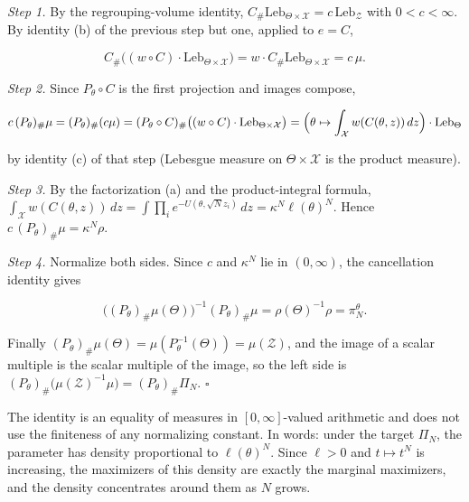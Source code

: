 \documentclass[11pt,a4paper]{article}
\begin{document}
\emph{Step 1.} By the regrouping-volume identity, \(C_\#\mathrm{Leb}_{\Theta\times\mathcal X}=c\,\mathrm{Leb}_{\mathcal Z}\) with \(0<c<\infty\). By identity (b) of the previous step but one, applied to \(e=C\),


\[C_\#\bigl((w\circ C)\cdot\mathrm{Leb}_{\Theta\times\mathcal X}\bigr)=w\cdot C_\#\mathrm{Leb}_{\Theta\times\mathcal X}=c\,\mu .\]


\emph{Step 2.} Since \(P_\theta\circ C\) is the first projection and images compose,


\[c\,(P_\theta)_\#\mu=(P_\theta)_\#(c\mu)=(P_\theta\circ C)_\#\bigl((w\circ C)\cdot\mathrm{Leb}_{\Theta\times\mathcal X}\bigr)=\Bigl(\theta\mapsto\int_{\mathcal X}w(C(\theta,z))\,dz\Bigr)\cdot\mathrm{Leb}_\Theta\]


by identity (c) of that step (Lebesgue measure on \(\Theta\times\mathcal X\) is the product measure).




\emph{Step 3.} By the factorization (a) and the product-integral formula, \(\int_{\mathcal X}w(C(\theta,z))\,dz=\int\prod_ie^{-U(\theta,\sqrt Nz_i)}\,dz=\kappa^N\ell(\theta)^N\). Hence \(c\,(P_\theta)_\#\mu=\kappa^N\rho\).




\emph{Step 4.} Normalize both sides. Since \(c\) and \(\kappa^N\) lie in \((0,\infty)\), the cancellation identity gives


\[\bigl((P_\theta)_\#\mu(\Theta)\bigr)^{-1}(P_\theta)_\#\mu=\rho(\Theta)^{-1}\rho=\pi_N^\theta .\]


Finally \((P_\theta)_\#\mu(\Theta)=\mu(P_\theta^{-1}(\Theta))=\mu(\mathcal Z)\), and the image of a scalar multiple is the scalar multiple of the image, so the left side is \((P_\theta)_\#\bigl(\mu(\mathcal Z)^{-1}\mu\bigr)=(P_\theta)_\#\Pi_N\). \(\square\)




The identity is an equality of measures in \([0,\infty]\)-valued arithmetic and does not use the finiteness of any normalizing constant. In words: under the target \(\Pi_N\), the parameter has density proportional to \(\ell(\theta)^N\). Since \(\ell>0\) and \(t\mapsto t^N\) is increasing, the maximizers of this density are exactly the marginal maximizers, and the density concentrates around them as \(N\) grows.
\end{document}
